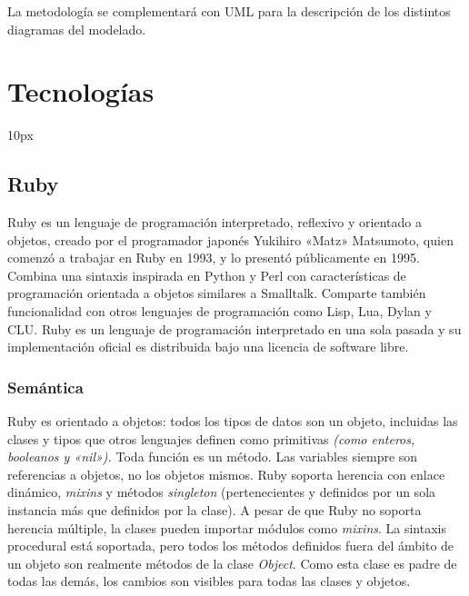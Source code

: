     La metodología se complementará con UML para la descripción de los distintos diagramas del modelado.    
    


\section{Tecnologías} %
  \label{sec:tecnologias}

  \begin{center}{
  	\fboxsep 10px
  	}\end{center}
  
  
  \subsection{Ruby} %
    \label{sub:tec_ruby}
    
    Ruby es un lenguaje de programación interpretado, reflexivo y orientado a objetos, creado por el programador japonés Yukihiro «Matz» Matsumoto, quien comenzó a trabajar en Ruby en 1993, y lo presentó públicamente en 1995. Combina una sintaxis inspirada en Python y Perl con características de programación orientada a objetos similares a Smalltalk. Comparte también funcionalidad con otros lenguajes de programación como Lisp, Lua, Dylan y CLU. Ruby es un lenguaje de programación interpretado en una sola pasada y su implementación oficial es distribuida bajo una licencia de software libre.
    
    \subsubsection{Semántica} %
    \label{ssub:ruby_semantica}
      Ruby es orientado a objetos: todos los tipos de datos son un objeto, incluidas las clases y tipos que otros lenguajes definen como primitivas {\it (como enteros, booleanos y «nil»).} Toda función es un método. Las variables siempre son referencias a objetos, no los objetos mismos. Ruby soporta herencia con enlace dinámico, {\it mixins} y métodos {\it singleton} (pertenecientes y definidos por un sola instancia más que definidos por la clase). A pesar de que Ruby no soporta herencia múltiple, la clases pueden importar módulos como {\it mixins}. La sintaxis procedural está soportada, pero todos los métodos definidos fuera del ámbito de un objeto son realmente métodos de la clase {\it Object}. Como esta clase es padre de todas las demás, los cambios son visibles para todas las clases y objetos.
      

